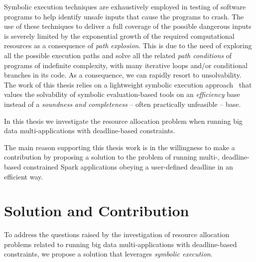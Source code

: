 Symbolic execution techniques are exhaustively employed in testing of software programs to help identify unsafe inputs that cause the programs to crash. The use of these techniques to deliver a full coverage of the possible dangerous inputs is severely limited by the exponential growth of the required computational resources as a consequence of \textit{path explosion}. This is  due to the need of exploring all the possible execution paths and solve all the related  \textit{path conditions} of programs of indefinite complexity, with many iterative loops and/or conditional branches in its code. As a consequence, we can rapidly resort to unsolvability. The work of this thesis relies on a lightweight symbolic execution  approach~\cite{Baresi-Quattrocchi-Denaro:2019} that values the solvability of symbolic evaluation-based tools on an \textit{efficiency} base instead of a \textit{soundness and completeness} -- often practically unfeasible -- base.

In this thesis we investigate the resource allocation problem when running big data multi-\plan applications with deadline-based \qos constraints. 


The main reason supporting this thesis work is in the willingness to make a contribution by proposing a solution to the problem of running multi-\plan, deadline-based \qos constrained Spark applications obeying a user-defined deadline in an efficient way.

\section{Solution and Contribution}\label{sec:solution_contribution}
To address the questions raised by the investigation of resource allocation problems related to running big data multi-\plan applications with deadline-based \qos constraints, we propose a solution that leverages \textit{symbolic execution}. 


